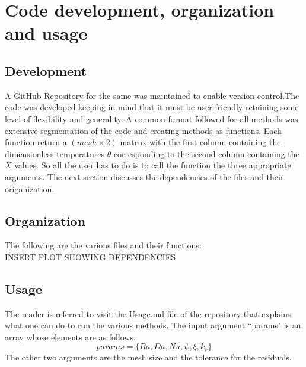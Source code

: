 \documentclass[12pt]{article}
\begin{document}
\section{Code development, organization and usage}\label{sec:Code}
\subsection{Development}
A \href{https://bit.ly/3wOF5EJ}{GitHub Repository} for the same was maintained to enable version control.The code was developed keeping in mind that it must be user-friendly retaining some level of flexibility and generality. A common format followed for all methods was extensive segmentation of the code and creating methods as functions. Each function return a $(mesh \times 2)$ matrux with the first column containing the dimensionless temperatures $\theta$ corresponding to the second column containing the $X$ values. So all the user has to do is to call the function the three appropriate arguments. The next section discusses the dependencies of the files and their origanization. 
\subsection{Organization}
The following are the various files and their functions: 
\\
INSERT PLOT SHOWING DEPENDENCIES
\\
\subsection{Usage}
The reader is referred to visit the \href{https://bit.ly/3aa4or7}{Usage.md} file of the repository that explains what one can do to run the various methods. The input argument ``params" is an array whose elements are as follows: 
\[
params = \{Ra, Da, Nu, \psi, \xi, k_r\} \tag{60} \label{60}
\]
The other two arguments are the mesh size and the tolerance for the residuals. 
%
%
\end{document}
